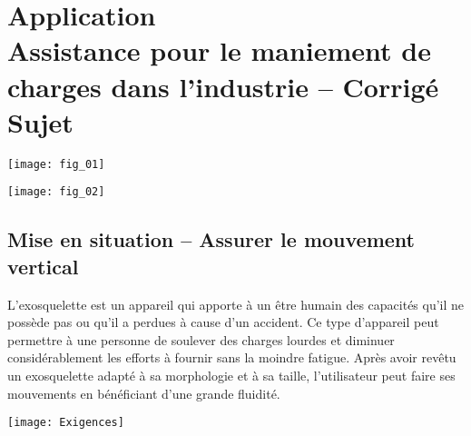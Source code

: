 \chapter*{Application  \\ 
Assistance pour le maniement de charges dans l’industrie -- \ifprof Corrigé \else Sujet \fi}

\iflivret {} \else
\ifprof  {} \else \fi
\fi

\setcounter{question}{0}
\begin{marginfigure}
\texttt{[image: fig\_01]}
\end{marginfigure}


\begin{marginfigure}
\texttt{[image: fig\_02]}
\end{marginfigure}



\section*{Mise en situation -- Assurer le mouvement vertical}
\ifprof
\else

\ifprof
\else
\noindent

L’exosquelette est un appareil qui apporte à un être humain des capacités qu’il ne possède pas ou qu’il a perdues à cause d’un accident. Ce type d’appareil peut permettre à une personne de soulever des charges lourdes et diminuer considérablement les efforts à fournir sans la moindre fatigue. Après avoir revêtu un exosquelette adapté à sa morphologie et à sa taille, l’utilisateur peut faire ses mouvements en bénéficiant
d’une grande fluidité.



\begin{center}
\texttt{[image: Exigences]}
\end{center}
\fi

